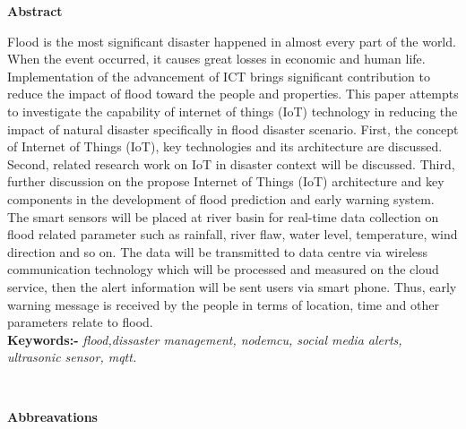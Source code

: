 \documentclass[a4paper,12pt]{report}
\begin{document}
\begin{center}
\noindent\LARGE \textbf{Abstract}
\end{center} 
\newline
Flood is the most significant disaster happened in
almost every part of the world. When the event occurred, it
causes great losses in economic and human life. Implementation
of the advancement of ICT brings significant contribution to
reduce the impact of flood toward the people and properties.
This paper attempts to investigate the capability of internet of
things (IoT) technology in reducing the impact of natural
disaster specifically in flood disaster scenario. First, the concept
of Internet of Things (IoT), key technologies and its architecture
are discussed. Second, related research work on IoT in disaster
context will be discussed. Third, further discussion on the
propose Internet of Things (IoT) architecture and key
components in the development of flood prediction and early
warning system. The smart sensors will be placed at river basin
for real-time data collection on flood related parameter such as
rainfall, river flaw, water level, temperature, wind direction and
so on. The data will be transmitted to data centre via wireless
communication technology which will be processed and
measured on the cloud service, then the alert information will be
sent users via smart phone. Thus, early warning message is
received by the people in terms of location, time and other
parameters relate to flood.\\
\textbf{Keywords:-} \textit {flood,dissaster management, nodemcu, social media alerts, ultrasonic sensor, mqtt.}



\noindent ~

\newpage
\vspace{2cm}

\tableofcontents




\noindent

\newpage
\listoffigures
\noindent

\noindent \textbf{}
\noindent

\newpage
\begin{center}
\noindent\LARGE \textbf{Abbreavations}
\end{center} 
\end{document}
